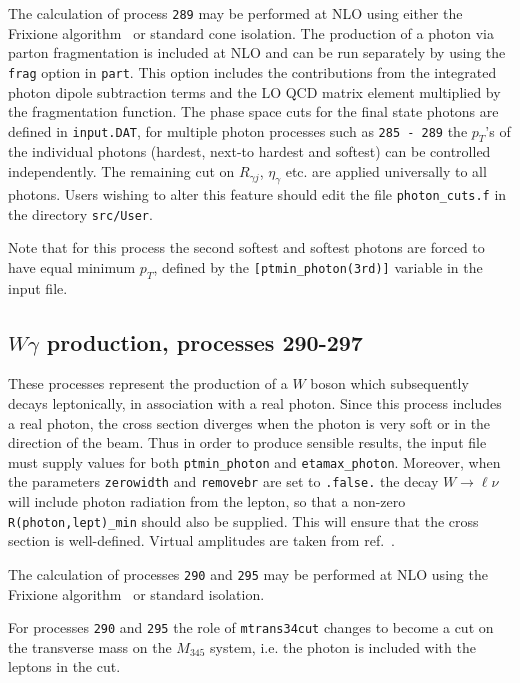 \documentclass[12pt]{article}
\begin{document}
The calculation of process {\tt 289} may be performed at NLO using either the
Frixione algorithm~\cite{Frixione:1998jh} or standard cone isolation.  The production of a photon via parton fragmentation is included at NLO and
can be run separately by using the {\tt frag} option in {\tt part}. This option includes the contributions from the integrated
photon dipole subtraction terms and the LO QCD matrix element multiplied by the fragmentation function.
The phase space cuts for the final state photons are defined in {\tt{input.DAT}}, for multiple photon processes such
as {\tt 285 - 289} the $p_T$'s of the individual photons (hardest, next-to hardest and softest) can be controlled independently.
The remaining cut on $R_{\gamma j}$, $\eta_{\gamma}$ etc. are applied universally to all photons. Users wishing to alter
this feature should edit the file {\tt{photon\_cuts.f}} in the directory {\tt{src/User}}.

Note that for this process the second softest and softest photons are forced to have equal minimum $p_T$, defined
by the {\tt{[ptmin\_photon(3rd)]}} variable in the input file.


\subsection{$W\gamma$ production, processes 290-297}
\label{subsec:wgamma}

These processes represent the production of a $W$ boson which subsequently
decays leptonically, in association with a real photon.
Since this process includes a real photon, the cross section diverges
when the photon is very soft or in the direction of the beam.
Thus in order to produce sensible results, the input file must supply values for both
{\tt ptmin\_photon} and {\tt etamax\_photon}. Moreover, when the parameters {\tt zerowidth}
and {\tt removebr} are set to {\tt .false.} the decay $W \to \ell \nu$ will include
photon radiation from the lepton, so that a non-zero {\tt R(photon,lept)\_min} should
also be supplied. This will ensure that the cross section is well-defined.
Virtual amplitudes are taken from ref.~\cite{Dixon:1998py}.

The calculation of processes {\tt 290} and {\tt 295} may be performed
at NLO using the Frixione algorithm~\cite{Frixione:1998jh} or standard isolation. 

For processes {\tt 290} and {\tt 295} the role of {\tt mtrans34cut} changes to become a cut 
on the transverse mass on the $M_{345}$ system, i.e. the photon is included with the leptons in the cut. 
\end{document}
